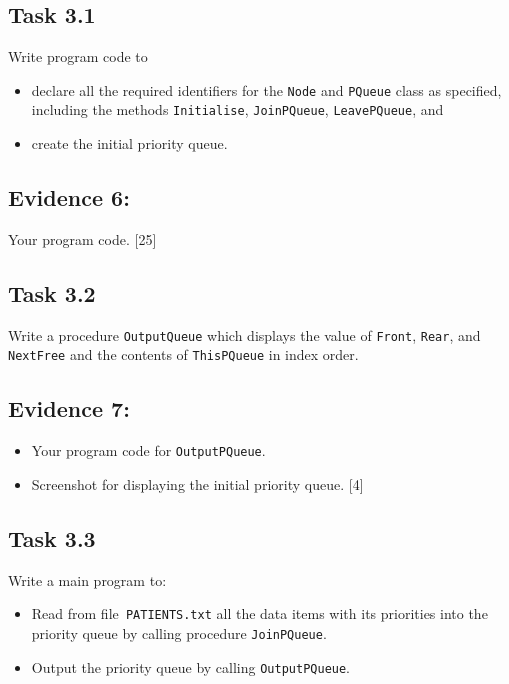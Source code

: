 \subsection*{Task 3.1 }

Write program code to
\begin{itemize}
\item declare all the required identifiers for the \texttt{Node} and \texttt{PQueue}
class as specified, including the methods \texttt{Initialise}, \texttt{JoinPQueue},
\texttt{LeavePQueue}, and 
\item create the initial priority queue. 
\end{itemize}

\subsection*{Evidence 6: }

Your program code. \hfill{}{[}25{]}

\subsection*{Task 3.2 }

Write a procedure \texttt{OutputQueue} which displays the value of
\texttt{Front}, \texttt{Rear}, and \texttt{NextFree} and the contents
of \texttt{ThisPQueue} in index order. 

\subsection*{Evidence 7: }
\begin{itemize}
\item Your program code for \texttt{OutputPQueue}.
\item Screenshot for displaying the initial priority queue. \hfill{}{[}4{]}
\end{itemize}

\subsection*{Task 3.3 }

Write a main program to:
\begin{itemize}
\item Read from file\texttt{ PATIENTS.txt} all the data items with its priorities
into the priority queue by calling procedure \texttt{JoinPQueue}.
\item Output the priority queue by calling \texttt{OutputPQueue}. 
\end{itemize}

